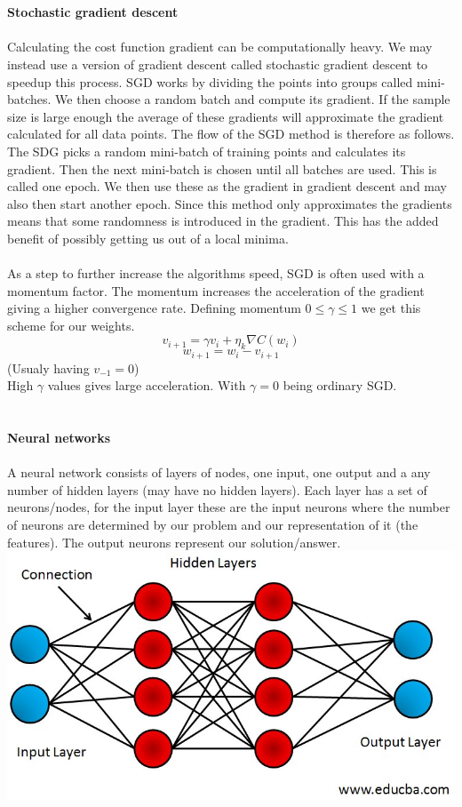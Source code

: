 \documentclass[12pt, letterpaper, twoside]{article}
\begin{document}
\ \\
\ \\
\textbf{Stochastic gradient descent}\\
\ \\
Calculating the cost function gradient can be computationally heavy. We may instead use a version of gradient descent called stochastic gradient descent to speedup this process. SGD works by dividing the points into groups called mini-batches. We then choose a random batch and compute its gradient. If the sample size is large enough the average of these gradients will approximate the gradient calculated for all data points. The flow of the SGD method is therefore as follows. The SDG picks a random mini-batch of training points and calculates its gradient. Then the next mini-batch is chosen until all batches are used. This is called one epoch. We then use these as the gradient in gradient descent and may also then start another epoch. Since this method only approximates the gradients means that some randomness is introduced in the gradient. This has the added benefit of possibly getting us out of a local minima.\\
\ \\
As a step to further increase the algorithms speed, SGD is often used with a momentum factor. The momentum increases the acceleration of the gradient giving a higher convergence rate. Defining momentum $0 \leq \gamma \leq 1$ we get this scheme for our weights.
$$
v_{i+1} = \gamma v_i + \eta_k \nabla C(w_i)
$$
$$
w_{i+1} = w_i - v_{i+1}
$$
(Usualy having $v_{-1} = 0$)\\
High $\gamma$ values gives large acceleration. With $\gamma = 0$ being ordinary SGD.\\
\ \\
\ \\
\textbf{Neural networks}\\
\ \\
A neural network consists of layers of nodes, one input, one output and a any number of hidden layers (may have no hidden layers).
Each layer has a set of neurons/nodes, for the input layer these are the input neurons where the number of neurons are determined by our problem and our representation of it (the features). The output neurons represent our solution/answer.\\
\includegraphics[scale=0.5]{"NN"}\\
\end{document}
